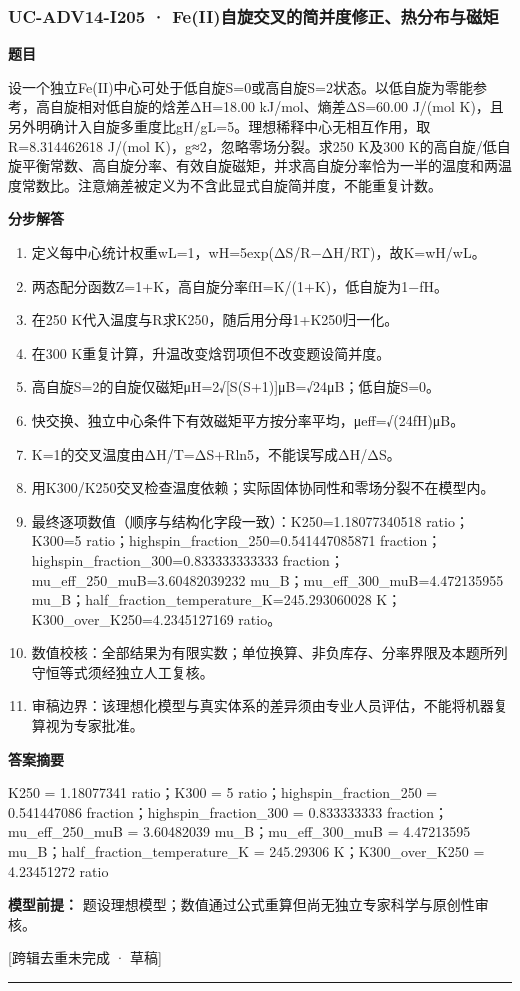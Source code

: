 \documentclass[UTF8,11pt,a4paper]{ctexart}
\begin{document}
\subsubsection*{UC-ADV14-I205 · Fe(II)自旋交叉的简并度修正、热分布与磁矩}
\noindent\textbf{题目}\par
设一个独立Fe(II)中心可处于低自旋S=0或高自旋S=2状态。以低自旋为零能参考，高自旋相对低自旋的焓差ΔH=18.00 kJ/mol、熵差ΔS=60.00 J/(mol K)，且另外明确计入自旋多重度比gH/gL=5。理想稀释中心无相互作用，取R=8.314462618 J/(mol K)，g≈2，忽略零场分裂。求250 K及300 K的高自旋/低自旋平衡常数、高自旋分率、有效自旋磁矩，并求高自旋分率恰为一半的温度和两温度常数比。注意熵差被定义为不含此显式自旋简并度，不能重复计数。\par
\medskip\noindent\textbf{分步解答}
\begin{enumerate}
\item 定义每中心统计权重wL=1，wH=5exp(ΔS/R−ΔH/RT)，故K=wH/wL。
\item 两态配分函数Z=1+K，高自旋分率fH=K/(1+K)，低自旋为1−fH。
\item 在250 K代入温度与R求K250，随后用分母1+K250归一化。
\item 在300 K重复计算，升温改变焓罚项但不改变题设简并度。
\item 高自旋S=2的自旋仅磁矩μH=2√[S(S+1)]μB=√24μB；低自旋S=0。
\item 快交换、独立中心条件下有效磁矩平方按分率平均，μeff=√(24fH)μB。
\item K=1的交叉温度由ΔH/T=ΔS+Rln5，不能误写成ΔH/ΔS。
\item 用K300/K250交叉检查温度依赖；实际固体协同性和零场分裂不在模型内。
\item 最终逐项数值（顺序与结构化字段一致）：K250=1.18077340518 ratio；K300=5 ratio；highspin\_fraction\_250=0.541447085871 fraction；highspin\_fraction\_300=0.833333333333 fraction；mu\_eff\_250\_muB=3.60482039232 mu\_B；mu\_eff\_300\_muB=4.472135955 mu\_B；half\_fraction\_temperature\_K=245.293060028 K；K300\_over\_K250=4.2345127169 ratio。
\item 数值校核：全部结果为有限实数；单位换算、非负库存、分率界限及本题所列守恒等式须经独立人工复核。
\item 审稿边界：该理想化模型与真实体系的差异须由专业人员评估，不能将机器复算视为专家批准。
\end{enumerate}
\noindent\textbf{答案摘要}\par
K250 = 1.18077341 ratio；K300 = 5 ratio；highspin\_fraction\_250 = 0.541447086 fraction；highspin\_fraction\_300 = 0.833333333 fraction；mu\_eff\_250\_muB = 3.60482039 mu\_B；mu\_eff\_300\_muB = 4.47213595 mu\_B；half\_fraction\_temperature\_K = 245.29306 K；K300\_over\_K250 = 4.23451272 ratio\par
\noindent\textbf{模型前提：}
题设理想模型；数值通过公式重算但尚无独立专家科学与原创性审核。\par
\noindent\textcolor{red!65!black}{[跨辑去重未完成 · 草稿]} \par
\medskip\hrule\medskip
{}
\end{document}
